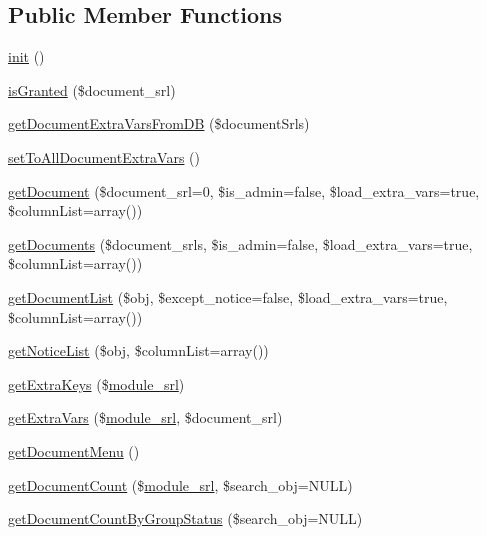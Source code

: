 \subsection*{Public Member Functions}
\begin{DoxyCompactItemize}
\item 
\hyperlink{classdocumentModel_a04a1f3814d77f78a588c61ab78ef1274}{init} ()
\item 
\hyperlink{classdocumentModel_acca118289b1b6e55c73dc21b7ed32d9c}{is\-Granted} (\$document\-\_\-srl)
\item 
\hyperlink{classdocumentModel_a10167011009da59ed649022e7ec42a39}{get\-Document\-Extra\-Vars\-From\-D\-B} (\$document\-Srls)
\item 
\hyperlink{classdocumentModel_a030147f71d77bdf6cf23798a2264445b}{set\-To\-All\-Document\-Extra\-Vars} ()
\item 
\hyperlink{classdocumentModel_a8846291323aaa3b090e7b8317f8175f2}{get\-Document} (\$document\-\_\-srl=0, \$is\-\_\-admin=false, \$load\-\_\-extra\-\_\-vars=true, \$column\-List=array())
\item 
\hyperlink{classdocumentModel_ae1ff6c76fde56ed76c9c7e4fa41d1525}{get\-Documents} (\$document\-\_\-srls, \$is\-\_\-admin=false, \$load\-\_\-extra\-\_\-vars=true, \$column\-List=array())
\item 
\hyperlink{classdocumentModel_a6b790f22fd3d00594e9a020694664d76}{get\-Document\-List} (\$obj, \$except\-\_\-notice=false, \$load\-\_\-extra\-\_\-vars=true, \$column\-List=array())
\item 
\hyperlink{classdocumentModel_a4a1ce3c359460cebecccbcb3047bf7bc}{get\-Notice\-List} (\$obj, \$column\-List=array())
\item 
\hyperlink{classdocumentModel_a6ba19d36ef767c052851a630823c300a}{get\-Extra\-Keys} (\$\hyperlink{ko_8install_8php_a370bb6450fab1da3e0ed9f484a38b761}{module\-\_\-srl})
\item 
\hyperlink{classdocumentModel_a38bc1b4332e7e8d7a0428b4a91a23198}{get\-Extra\-Vars} (\$\hyperlink{ko_8install_8php_a370bb6450fab1da3e0ed9f484a38b761}{module\-\_\-srl}, \$document\-\_\-srl)
\item 
\hyperlink{classdocumentModel_ac7c07ca7bd1c7e72f4fcacfb176097b0}{get\-Document\-Menu} ()
\item 
\hyperlink{classdocumentModel_aa5b09d4901c5733ad9795af72ed50f1c}{get\-Document\-Count} (\$\hyperlink{ko_8install_8php_a370bb6450fab1da3e0ed9f484a38b761}{module\-\_\-srl}, \$search\-\_\-obj=N\-U\-L\-L)
\item 
\hyperlink{classdocumentModel_a495a49acccae8f20257db40accdffb88}{get\-Document\-Count\-By\-Group\-Status} (\$search\-\_\-obj=N\-U\-L\-L)

\end{DoxyCompactItemize}
